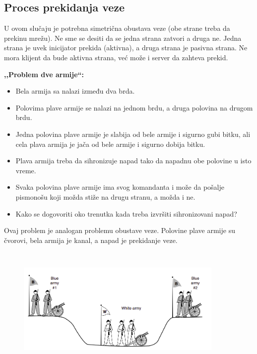 \documentclass[a4paper]{article}
\begin{document}
    \subsection{Proces prekidanja veze}
        U ovom slučaju je potrebna simetrična obustava veze (obe strane treba da prekinu mrežu). 
        Ne sme se desiti da se jedna strana zatvori a druga ne. Jedna strana je uvek inicijator
        prekida (aktivna), a druga strana je pasivna strana. Ne mora klijent da bude aktivna strana, 
        već može i server da zahteva prekid.
        
        \textbf{,,Problem dve armije``:} 
        \begin{itemize}
            \item Bela armija sa nalazi između dva brda.
            \item Polovima plave armije se nalazi na jednom brdu, a druga polovina na drugom brdu.
            \item Jedna polovina plave armije je slabija od bele armije i sigurno gubi bitku, 
                  ali cela plava armija je jača od bele armije i sigurno dobija bitku. 
            \item Plava armija treba da sihronizuje napad tako da napadnu obe polovine u isto vreme.
            \item Svaka polovina plave armije ima svog komandanta i može
                  da pošalje pismonošu koji možda stiže na drugu stranu, a možda i ne.
            \item Kako se dogovoriti oko trenutka kada treba izvršiti sihronizovani napad?
        \end{itemize} 
        \indent Ovaj problem je analogan problemu obustave veze. Polovine plave armije su čvorovi, 
        bela armija je kanal, a napad je prekidanje veze. 
        \begin{figure}[H]
            \begin{center}
                \includegraphics[width=100mm,height=60mm]{Slike/armije.png}
            \end{center}
        \end{figure}
\end{document}
